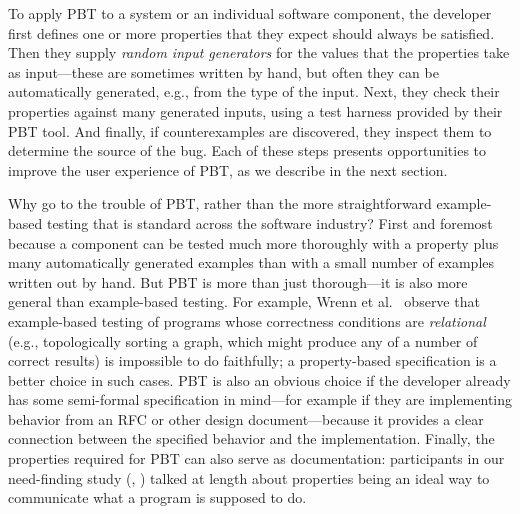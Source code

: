To apply PBT to a system or an individual software component, the
developer first defines one
or more properties that they expect should always be satisfied. Then
they supply {\em random input generators} for the values that the
properties take as input---these are sometimes written by hand, but
often they can be automatically generated, e.g., from the type of the
input. Next, they check their properties against many generated
inputs, using a test harness provided by their PBT tool. And finally, if
counterexamples are discovered, they inspect them to determine the
source of the bug.  Each of these steps presents opportunities\iflater{}\fi{} to
improve the user experience of PBT, as we describe in the next
section.

\smallskip

Why go to the trouble of PBT, rather than the more straightforward
example-based testing that is standard across the software industry?
First and foremost because a component can be tested much more
thoroughly with a property plus many automatically generated examples
than with a small number of examples written out by hand.
But
PBT is more than just thorough---it is also more general than example-based
testing. For example, Wrenn et al.~\cite{wrenn2021using} observe that example-based testing
of programs whose correctness conditions are {\em relational} (e.g.,
topologically sorting a graph, which might
produce any of a number of correct results) is impossible to do
faithfully; a property-based specification is a better choice in
such cases.
PBT is also
an obvious choice if
the developer already has some semi-formal
specification in mind---for example if they are implementing behavior from an RFC or
other design document---because it provides a clear connection between the
specified behavior and the implementation.
Finally, the
properties required for PBT can also serve as documentation:
participants in our need-finding study (, )
talked at length about properties being an ideal way to communicate what a
program is supposed to do.

\iflater{}\fi


